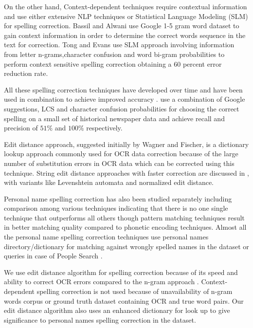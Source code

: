 \documentclass[letterpaper,11pt]{report}
\begin{document}
On the other hand, Context-dependent techniques require contextual information and use either extensive NLP techniques or Statistical Language Modeling (SLM) for spelling correction.
Bassil and Alwani\cite{bassil2012ocr} use Google 1-5 gram word dataset to gain context information in order to determine the correct words sequence in the text for correction.
Tong and Evans\cite{tong1996statistical} use SLM approach involving information from letter n-grams,character confusion and word bi-gram probabilities to perform context sensitive spelling correction obtaining a 60 percent error reduction rate. 

All these spelling correction techniques have developed over time and have been used in combination to achieve improved accuracy \cite{brill2000improved}. \cite{agarwal2013utilizing} use a combination of Google suggestions, LCS and character confusion probabilities for choosing the correct spelling on a small set of historical newspaper data and achieve recall and precision of $51\%$ and $100\%$ respectively.


Edit distance approach, suggested initially by Wagner and Fischer\cite{wagner1974string}, is a dictionary lookup approach commonly used for OCR data correction because of the large number of substitution errors in OCR data  \cite{kukich1992techniques}\cite{christen2006comparison} which can be corrected using this technique. String edit distance approaches with faster correction are discussed in \cite{marzal1993computation},\cite{schulz2002fast}  with variants like Levenshtein automata and normalized edit distance.

Personal name spelling correction has also been studied separately including comparison among various techniques indicating that there is no one single technique that outperforms all others though pattern matching techniques result in better matching quality compared to phonetic encoding techniques\cite{christen2006comparison}. Almost all the personal name spelling correction techniques use personal names directory/dictionary for matching against wrongly spelled names in the dataset or queries in case of People Search \cite{udupa2010hashing}. 
  
 We use edit distance algorithm for spelling correction because of its speed and ability to correct OCR errors compared to the n-gram approach \cite{chattopadhyaya2013fast}. Context-dependent spelling correction is not used because of unavailability of n-gram words corpus or ground truth dataset containing OCR and true word pairs. Our edit distance algorithm also uses an enhanced dictionary for look up to give significance to personal names spelling correction in the dataset. 
\end{document}

